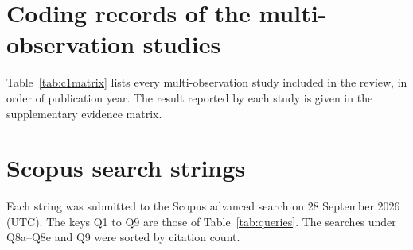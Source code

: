 \documentclass[a4paper,fleqn]{cas-dc}
\begin{document}
\section{Coding records of the multi-observation studies}\label{app:c1}
Table~\ref{tab:c1matrix} lists every multi-observation study included in the review, in order of publication year. The result reported by each study is given in the supplementary evidence matrix.

\section{Scopus search strings}\label{app:queries}
Each string was submitted to the Scopus advanced search on 28 September 2026 (UTC). The keys Q1 to Q9 are those of Table~\ref{tab:queries}. The searches under Q8a--Q8e and Q9 were sorted by citation count.

\end{document}
